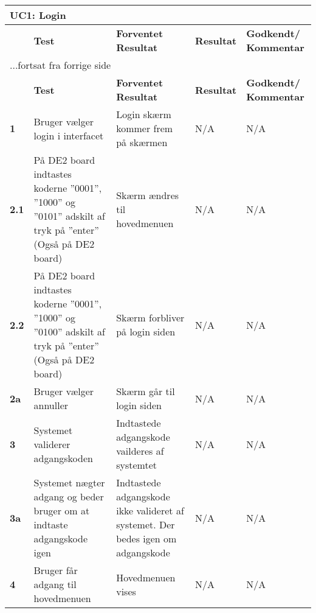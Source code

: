 
\begin{center}
\begin{longtable}{|p{}|p{}|p{}|p{}|p{}|} %
\hline
\multicolumn{5}{|l|}{\textbf{UC1: Login}} \\ \hline
\multicolumn{1}{|c|}{} &
\textbf{Test} &
\textbf{Forventet \newline Resultat} &
\textbf{Resultat} &
\textbf{Godkendt/ \newline Kommentar} \\ \hline 
\endfirsthead

\multicolumn{5}{l}{...fortsat fra forrige side} \\ \hline 
\multicolumn{1}{c|}{} &
\textbf{Test} &
\textbf{Forventet \newline Resultat} &
\textbf{Resultat} &
\textbf{Godkendt/ \newline Kommentar} \\ \hline 
\endhead


\textbf{1}		
&Bruger vælger login i interfacet
&Login skærm kommer frem på skærmen 	
&N/A 	
&N/A \\\hline
\textbf{2.1}		
&På DE2 board indtastes koderne ''0001'', ''1000'' og ''0101'' adskilt af tryk på ''enter'' (Også på DE2 board) 
&Skærm ændres til hovedmenuen
&N/A 	
&N/A \\\hline
\textbf{2.2}		
&På DE2 board indtastes koderne ''0001'', ''1000'' og ''0100'' adskilt af tryk på ''enter'' (Også på DE2 board) 
&Skærm forbliver på login siden	
&N/A 	
&N/A \\\hline
\textbf{2a}		
&Bruger vælger annuller	
&Skærm går til login siden	
&N/A 	
&N/A \\\hline

\textbf{3}		
&Systemet validerer adgangskoden		
&Indtastede adgangskode vailderes af systemtet 	
&N/A 	
&N/A \\\hline
\textbf{3a}		
&Systemet nægter adgang og beder bruger om at indtaste adgangskode igen	
&Indtastede adgangskode ikke valideret af systemet. Der bedes igen om adgangskode	
&N/A 	
&N/A \\\hline
\textbf{4}		
&Bruger får adgang til hovedmenuen		
&Hovedmenuen vises
&N/A 	
&N/A  \\\hline
	\end{longtable}
	\label{ATUC1} 
\end{center}
